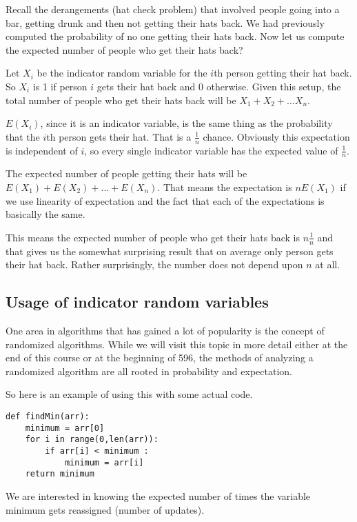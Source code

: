 \documentclass[12pt]{article}
\begin{document}
Recall the derangements (hat check problem) that involved people going into a bar, getting drunk and then not getting their hats back. We had previously computed the probability of no one getting their hats back. Now let us compute the expected number of people who get their hats back?

Let $X_i$ be the indicator random variable for the $i$th person getting their hat back. So $X_i$ is 1 if person $i$ gets their hat back and 0 otherwise. Given this setup, the total number of people who get their hats back will be $X_1 + X_2 + \ldots X_n$.

$E(X_i)$, since it is an indicator variable, is the same thing as the probability that the $i$th person gets their hat. That is a $\frac{1}{n}$ chance. Obviously this expectation is independent of $i$, so every single indicator variable has the expected value of $\frac{1}{n}$.

The expected number of people getting their hats will be $E(X_1) + E(X_2) + \ldots + E(X_n)$. That means the expectation is $nE(X_1)$ if we use linearity of expectation and the fact that each of the expectations is basically the same. 

This means the expected number of people who get their hats back is $n \frac{1}{n}$ and that gives us the somewhat surprising result that on average only person gets their hat back. Rather surprisingly, the number does not depend upon $n$ at all.

\subsection*{Usage of indicator random variables}
One area in algorithms that has gained a lot of popularity is the concept of randomized algorithms. While we will visit this topic in more detail either at the end of this course or at the beginning of 596, the methods of analyzing a randomized algorithm are all rooted in probability and expectation. 

So here is an example of using this with some actual code.

\begin{verbatim}
def findMin(arr):
    minimum = arr[0]
    for i in range(0,len(arr)):
        if arr[i] < minimum :
            minimum = arr[i]
    return minimum
\end{verbatim}

We are interested in knowing the expected number of times the variable minimum gets reassigned (number of updates). 
\end{document}

